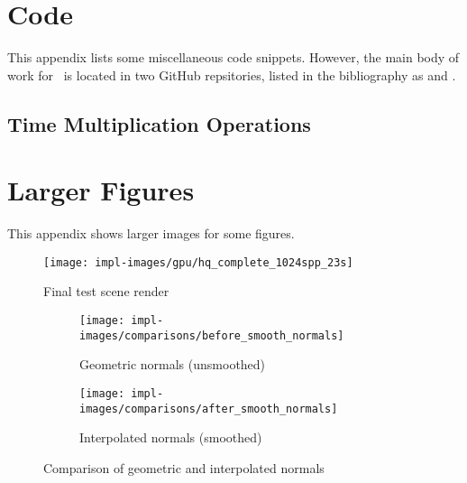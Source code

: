 %
%

\chapter{Code}\label{appendix:code}
This appendix lists some miscellaneous code snippets.
However, the main body of work for \name\ is located in two GitHub repsitories, listed in the bibliography as \cite{raytermCpuImpl} and \cite{raytermGpuImpl}.


\section{Time Multiplication Operations}\label{appendix:timemul}


\chapter{Larger Figures}\label{appendix:large_figures}
This appendix shows larger images for some figures.

\vspace{0.3em}
\begin{figure}[htb]
  \centering
  \texttt{[image: impl-images/gpu/hq\_complete\_1024spp\_23s]}
  \caption{Final test scene render}
  \label{fig:rayterm-gpu_final_render_large}
\end{figure}

\vspace{0.3em}
\begin{figure}[htb]
  \centering
  \begin{subfigure}[htb]{\textwidth}
    \texttt{[image: impl-images/comparisons/before\_smooth\_normals]}
    \caption{Geometric normals (unsmoothed)}
    \label{fig:rayterm-gpu_unsmoothed_normals_large}
  \end{subfigure}
  \begin{subfigure}[htb]{\textwidth}
    \texttt{[image: impl-images/comparisons/after\_smooth\_normals]}
    \caption{Interpolated normals (smoothed)}
    \label{fig:rayterm-gpu_smoothed_normals_large}
  \end{subfigure}
  \caption{Comparison of geometric and interpolated normals}
  \label{fig:rayterm-gpu_smooth_normal_comparison_large}
\end{figure}


